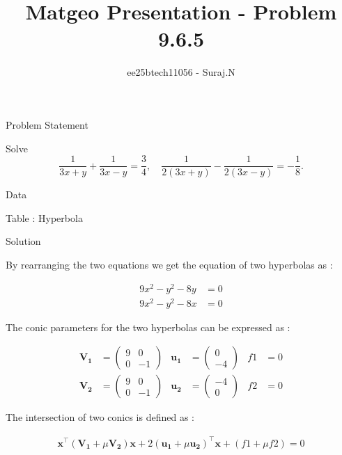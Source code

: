 \documentclass{beamer}
\title{Matgeo Presentation - Problem 9.6.5}
\author{ee25btech11056 - Suraj.N}
\numberwithin{equation}{section}
\theoremstyle{remark}
\newcommand{\myvec}[1]{\ensuremath{\begin{pmatrix}#1\end{pmatrix}}}
\let\vec\mathbf
\begin{document}
\begin{frame}
  \titlepage
\end{frame}

\begin{frame}{Problem Statement}

Solve
\[
\frac{1}{3x+y} + \frac{1}{3x-y} = \frac{3}{4}, \quad 
\frac{1}{2(3x+y)} - \frac{1}{2(3x-y)} = -\frac{1}{8}.
\]

\end{frame}

\begin{frame}{Data}

\begin{table}[h!]
  \centering
  
  \caption*{Table : Hyperbola}
  \label{9.6.5}
\end{table}

\end{frame}

\begin{frame}{Solution}

By rearranging the two equations we get the equation of two hyperbolas as :

\begin{align}
  9x^2 - y^2 -8y &= 0\\
  9x^2 - y^2 -8x &= 0
\end{align}

The conic parameters for the two hyperbolas can be expressed as :

\begin{align}
  \vec{V_1} &= \myvec{9 & 0\\0 & -1} & \vec{u_1} &= \myvec{0 \\ -4} & f1 &= 0\\
  \vec{V_2} &= \myvec{9 & 0\\0 & -1} & \vec{u_2} &= \myvec{-4 \\ 0} & f2 &= 0
\end{align}

The intersection of two conics is defined as :

\begin{align}
  \vec{x}^\top(\vec{V_1}+\mu\vec{V_2})\vec{x} + 2(\vec{u_1}+\mu\vec{u_2})^\top\vec{x} + (f1 + \mu f2) = 0 \label{eq:conic} 
\end{align}

\end{frame}
\end{document}
